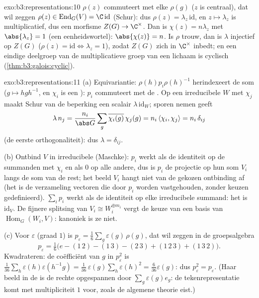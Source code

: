 \begin{solution}{exo:b3:representations:10}
$\rho(z)$ commuteert met elke $\rho(g)$ ($z$ is centraal), dat wil
zeggen $\rho(z) \in \operatorname{End}_G(V) = \C\,\mathrm{id}$
(Schur): dus $\rho(z) = \lambda_z\,\mathrm{id}$, en $z \mapsto
\lambda_z$ is multiplicatief, dus een morfisme $Z(G) \to
\C^\times$. Dan is $\chi(z) = n\lambda_z$ met $\abs{\lambda_z} =
1$ (een eenheidswortel): $\abs{\chi(z)} = n$. Is $\rho$ trouw, dan
is $\lambda$ injectief op $Z(G)$ ($\rho(z) = \mathrm{id} \iff
\lambda_z = 1$), zodat $Z(G)$ zich in $\C^\times$ inbedt; en een
eindige deelgroep van de multiplicatieve groep van een lichaam is
cyclisch (\cref{thm:b3:galois:cyclic}).
\end{solution}

\begin{solution}{exo:b3:representations:11}
(a) Equivariantie: $\rho(h)p_i\rho(h)^{-1}$ herindexeert de som
($g \mapsto hgh^{-1}$, en $\chi_i$ is een ): $p_i$
commuteert met de . Op een irreducibele $W$ met 
$\chi_j$ maakt Schur van de beperking een scalair
$\lambda\,\mathrm{id}_W$; sporen nemen geeft
\[
\lambda\,n_j = \frac{n_i}{\abs G}\sum_g
\overline{\chi_i(g)}\,\chi_j(g) = n_i\,\langle\chi_i,
\chi_j\rangle = n_i\,\delta_{ij}
\]
(de eerste orthogonaliteit): dus $\lambda = \delta_{ij}$.

(b) Ontbind $V$ in irreducibele (Maschke): $p_i$ werkt als de
identiteit op de summanden met  $\chi_i$ en als $0$ op
alle andere, dus is $p_i$ de projectie op hun som $V_i$ langs de
som van de rest; het beeld $V_i$ hangt niet van de gekozen
ontbinding af (het is de verzameling vectoren die door $p_i$
worden vastgehouden, zonder keuzen gedefinieerd). $\sum_ip_i$
werkt als de identiteit op elke irreducibele summand: het is
$\mathrm{id}_V$. De fijnere splitsing van $V_i \cong
W_i^{\oplus m_i}$ vergt de keuze van een basis van
$\operatorname{Hom}_G(W_i, V)$: kanoniek is ze niet.

(c) Voor $\varepsilon$ (graad $1$) is $p_\varepsilon =
\frac1{6}\sum_{g}\varepsilon(g)\,\rho(g)$, dat wil zeggen in de
groepsalgebra
\[
p_\varepsilon = \tfrac16\bigl(e - (1\,2) - (1\,3) - (2\,3)
+ (1\,2\,3) + (1\,3\,2)\bigr) .
\]
Kwadrateren: de coëfficiënt van $g$ in $p_\varepsilon^2$ is
$\frac1{36}\sum_{h}\varepsilon(h)\varepsilon(h^{-1}g) =
\frac1{36}\,\varepsilon(g)\sum_h\varepsilon(h)^2 =
\frac{6}{36}\varepsilon(g)$: dus $p_\varepsilon^2 =
p_\varepsilon$. (Haar beeld in de  is de
rechte opgespannen door $\sum_g\varepsilon(g)e_g$: de
tekenrepresentatie komt met multipliciteit $1$ voor, zoals de
algemene theorie eist.)
\end{solution}

